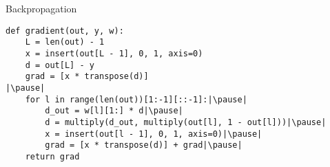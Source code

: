 \begin{frame}[fragile]
  \begin{block}{Backpropagation}
    \begin{lstlisting}
def gradient(out, y, w):
    L = len(out) - 1
    x = insert(out[L - 1], 0, 1, axis=0)
    d = out[L] - y
    grad = [x * transpose(d)]
|\pause|
    for l in range(len(out))[1:-1][::-1]:|\pause|
        d_out = w[l][1:] * d|\pause|
        d = multiply(d_out, multiply(out[l], 1 - out[l]))|\pause|
        x = insert(out[l - 1], 0, 1, axis=0)|\pause|
        grad = [x * transpose(d)] + grad|\pause|
    return grad
    \end{lstlisting}
  \end{block}
\end{frame}
